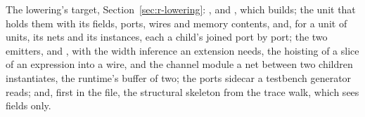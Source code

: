 The lowering's target, Section~\ref{sec:r-lowering}: ,
 and , which \code{\#[lower]} builds; the
 unit that holds them with its fields, ports, wires and
memory contents, and, for a unit of units, its nets and its
instances, each a child's  joined port by port; the
two emitters,  and , with the width
inference an extension needs, the hoisting of a slice of an
expression into a wire, and the channel module a net between two
children instantiates, the runtime's buffer of two; the ports sidecar
a testbench generator reads; and, first in the file, the structural
skeleton from the trace walk, which sees fields only.


